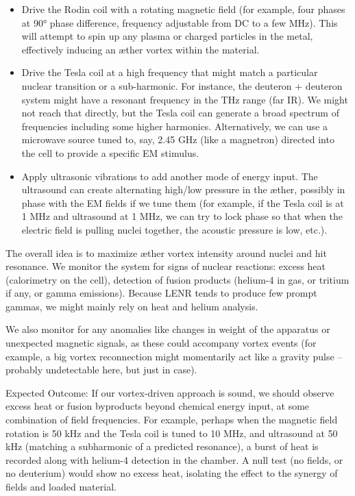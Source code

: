 \begin{itemize}

\item 
Drive the Rodin coil with a rotating magnetic field (for example, four phases at 90° phase difference, frequency adjustable from DC to a few MHz). This will attempt to spin up any plasma or charged particles in the metal, effectively inducing an æther vortex within the material.




\item 
Drive the Tesla coil at a high frequency that might match a particular nuclear transition or a sub-harmonic. For instance, the deuteron + deuteron system might have a resonant frequency in the THz range (far IR). We might not reach that directly, but the Tesla coil can generate a broad spectrum of frequencies including some higher harmonics. Alternatively, we can use a microwave source tuned to, say, 2.45 GHz (like a magnetron) directed into the cell to provide a specific EM stimulus.




\item 
Apply ultrasonic vibrations to add another mode of energy input. The ultrasound can create alternating high/low pressure in the æther, possibly in phase with the EM fields if we tune them (for example, if the Tesla coil is at 1 MHz and ultrasound at 1 MHz, we can try to lock phase so that when the electric field is pulling nuclei together, the acoustic pressure is low, etc.).




\end{itemize}

The overall idea is to maximize æther vortex intensity around nuclei and hit resonance. We monitor the system for signs of nuclear reactions: excess heat (calorimetry on the cell), detection of fusion products (helium-4 in gas, or tritium if any, or gamma emissions). Because LENR tends to produce few prompt gammas, we might mainly rely on heat and helium analysis.


We also monitor for any anomalies like changes in weight of the apparatus or unexpected magnetic signals, as these could accompany vortex events (for example, a big vortex reconnection might momentarily act like a gravity pulse – probably undetectable here, but just in case).


Expected Outcome: If our vortex-driven approach is sound, we should observe excess heat or fusion byproducts beyond chemical energy input, at some combination of field frequencies. For example, perhaps when the magnetic field rotation is 50 kHz and the Tesla coil is tuned to 10 MHz, and ultrasound at 50 kHz (matching a subharmonic of a predicted resonance), a burst of heat is recorded along with helium-4 detection in the chamber. A null test (no fields, or no deuterium) would show no excess heat, isolating the effect to the synergy of fields and loaded material.


